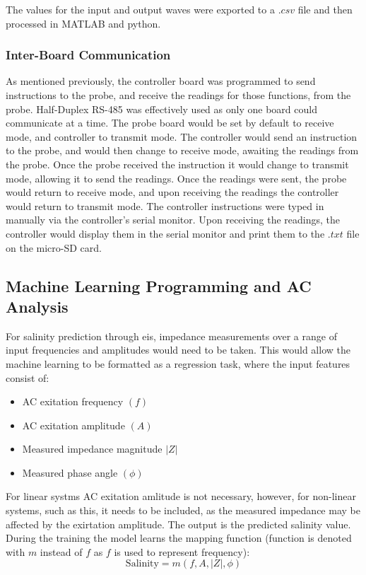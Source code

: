 The values for the input and output waves were exported to a $.csv$ file and then processed in MATLAB and python.

\subsubsection{Inter-Board Communication}
As mentioned previously, the controller board was programmed to send instructions to the probe, and receive the readings for those functions, from the probe.
Half-Duplex RS-485 was effectively used as only one board could communicate at a time.
The probe board would be set by default to receive mode, and controller to transmit mode.
The controller would send an instruction to the probe, and would then change to receive mode, awaiting the readings from the probe.
Once the probe received the instruction it would change to transmit mode, allowing it to send the readings.
Once the readings were sent, the probe would return to receive mode, and upon receiving the readings the controller would return to transmit mode.
The controller instructions were typed in manually via the controller's serial monitor.
Upon receiving the readings, the controller would display them in the serial monitor and print them to the $.txt$ file on the micro-SD card.

\subsection{Machine Learning Programming and AC Analysis}\label{sec:ml_for_eis}

For salinity prediction through \gls{eis}, impedance measurements over a range of input frequencies and amplitudes would need to be taken.
This would allow the machine learning to be formatted as a regression task, where the input features consist of:
\begin{itemize}
    \item AC exitation frequency $(f)$
    \item AC exitation amplitude $(A)$
    \item Measured impedance magnitude $|Z|$
    \item Measured phase angle $(\phi)$
\end{itemize}

For linear systms AC exitation amlitude is not necessary, however, for non-linear systems, such as this, it needs to be included, as the measured impedance may be affected by the exirtation amplitude.
The output is the predicted salinity value. During the training the model learns the mapping function (function is denoted with $m$ instead of $f$ as $f$ is used to represent frequency):
\begin{equation}
    \text{Salinity}= m(f,A,|Z|,\phi)
\end{equation}


